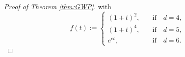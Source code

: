 \documentclass[11pt]{amsart}
\theoremstyle{definition}
\theoremstyle{remark}
\numberwithin{equation}{section}
\numberwithin{equation}{section}
\newcommand{\nrm}[1]{\Vert#1\Vert}
\newcommand{\0}{\emptyset}
\newcommand{\ift}{\infty}
\newcommand{\bbR}{\mathbb R}
\begin{document}
\begin{proof}[Proof of Theorem \ref{thm:GWP}]
		with
		\begin{equation}
			f(t):=\begin{cases}
				(1+t)^{2},&\quad\text{if}\quad d=4,\\
				(1+t)^{4},&\quad\text{if}\quad d=5,\\
				e^{ct},&\quad\text{if}\quad d=6.
			\end{cases}
		\end{equation}			

\end{proof}
\end{document}
